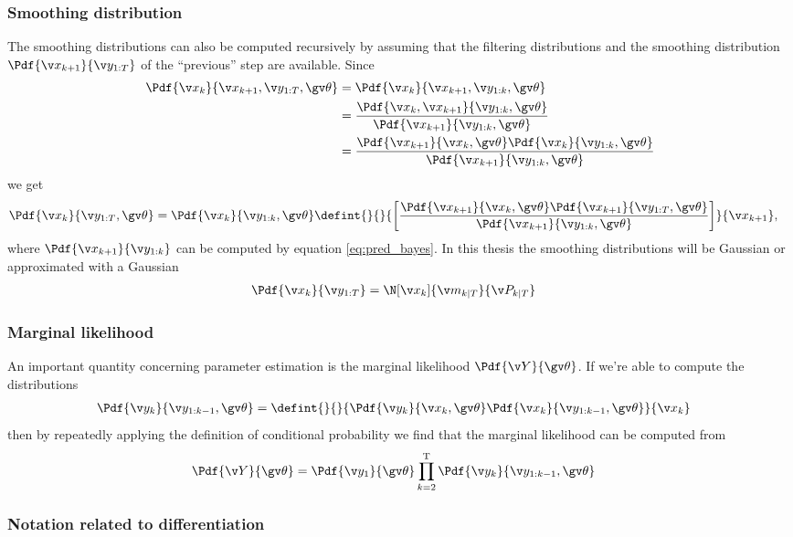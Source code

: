 \subsubsection*{Smoothing distribution}
The smoothing distributions can also be computed recursively by assuming that the filtering distributions
and the smoothing distribution $\Pdf{\x_{k+1}}{\y_{1:T}}$ of the ``previous'' step are available.
Since
\begin{align*}
	\Pdf{\xk}{\x_{k+1},\y_{1:T},\Th}&=\Pdf{\xk}{\x_{k+1},\y_{1:k},\Th}\\
	&=\frac{\Pdf{\xk,\x_{k+1}}{\y_{1:k},\Th}}{\Pdf{\x_{k+1}}{\y_{1:k},\Th}}\\
	&=\frac{\Pdf{\x_{k+1}}{\xk,\Th}\Pdf{\xk}{\y_{1:k},\Th}}{\Pdf{\x_{k+1}}{\y_{1:k},\Th}}
\end{align*}
we get
\begin{align}
	\Pdf{\xk}{\y_{1:T},\Th}&=\Pdf{\xk}{\y_{1:k},\Th}\defint{}{}{\left[\frac{\Pdf{\x_{k+1}}{\xk,\Th}\Pdf{\x_{k+1}}{\y_{1:T},\Th}}{\Pdf{\x_{k+1}}{\y_{1:k},\Th}}\right]}{\x_{k+1}},
\end{align}
where $\Pdf{\x_{k+1}}{\y_{1:k}}$ can be computed by equation \eqref{eq:pred_bayes}.
In this thesis the smoothing distributions will be Gaussian or approximated with a Gaussian
\begin{align}
	\Pdf{\xk}{\y_{1:T}}&=\N[\xk]{\m_{k|T}}{\P_{k|T}}
\end{align}

\subsubsection*{Marginal likelihood}

An important quantity concerning parameter estimation is the marginal likelihood $\Pdf{\Y}{\Th}$. 
If we're able to compute the distributions
\begin{align}
	\Pdf{\y_k}{\y_{1:k-1},\Th}&=\defint{}{}{\Pdf{\yk}{\xk,\Th}\Pdf{\xk}{\y_{1:k-1},\Th}}{\xk}
\end{align}
then by repeatedly applying the definition of conditional probability 
we find that the marginal likelihood can be computed from
\begin{align}
	\Pdf{\Y}{\Th}&=\Pdf{\y_1}{\Th}\prod_{k=2}^\tr \Pdf{\y_k}{\y_{1:k-1},\Th}
	\label{eq:lh_factorization}
\end{align}

\subsubsection{Notation related to differentiation}

